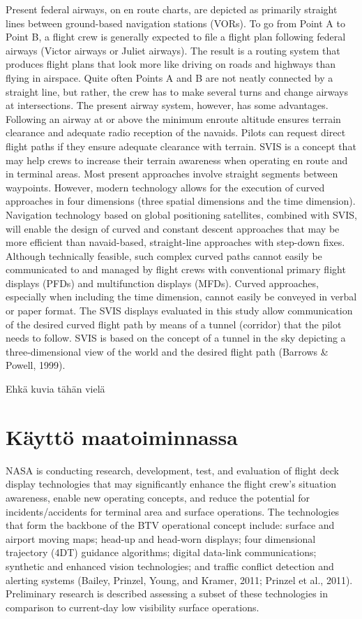 \documentclass[utf8,bachelor,manualbib]{gradu3}
\begin{document}
Present federal airways, on en route charts, are depicted as primarily straight
lines between ground-based navigation stations (VORs). To go from Point A to
Point B, a flight crew is generally expected to file a flight plan following federal
airways (Victor airways or Juliet airways). The result is a routing system that produces
flight plans that look more like driving on roads and highways than flying in
airspace. Quite often Points A and B are not neatly connected by a straight line, but
rather, the crew has to make several turns and change airways at intersections. The
present airway system, however, has some advantages. Following an airway at or
above the minimum enroute altitude ensures terrain clearance and adequate radio
reception of the navaids. Pilots can request direct flight paths if they ensure adequate
clearance with terrain. SVIS is a concept that may help crews to increase
their terrain awareness when operating en route and in terminal areas.
Most present approaches involve straight segments between waypoints. However,
modern technology allows for the execution of curved approaches in four dimensions
(three spatial dimensions and the time dimension). Navigation technology
based on global positioning satellites, combined with SVIS, will enable the
design of curved and constant descent approaches that may be more efficient than
navaid-based, straight-line approaches with step-down fixes. Although technically
feasible, such complex curved paths cannot easily be communicated to and
managed by flight crews with conventional primary flight displays (PFDs) and
multifunction displays (MFDs). Curved approaches, especially when including
the time dimension, cannot easily be conveyed in verbal or paper format.
The SVIS displays evaluated in this study allow communication of the desired
curved flight path by means of a tunnel (corridor) that the pilot needs to follow.
SVIS is based on the concept of a tunnel in the sky depicting a three-dimensional
view of the world and the desired flight path (Barrows \& Powell, 1999). \citep{schnell2004}

Ehkä kuvia tähän vielä \citep{schnell2004}

\section{Käyttö maatoiminnassa}

NASA is conducting research, development, test, and evaluation of flight deck display technologies that may significantly enhance the flight crew's situation awareness, enable new operating concepts, and reduce the potential for incidents/accidents for terminal area and surface operations. The technologies that form the backbone of the BTV operational concept include: surface and airport moving maps; head-up and head-worn displays; four dimensional trajectory (4DT) guidance algorithms; digital data-link communications; synthetic and enhanced vision technologies; and traffic conflict detection and alerting systems (Bailey, Prinzel, Young, and Kramer, 2011; Prinzel et al., 2011). Preliminary research is described assessing a subset of these technologies in comparison to current-day low visibility surface operations. \citep{prinzel2013}
\end{document}
